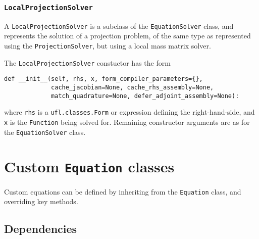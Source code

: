\documentclass[11pt]{article}
\begin{document}
\subsubsection{\texttt{LocalProjectionSolver}}

A \texttt{LocalProjectionSolver} is a subclass of the \texttt{EquationSolver}
class, and represents the solution of a projection problem, of the same type as
represented using the \texttt{ProjectionSolver}, but using a local mass matrix
solver.

The \texttt{LocalProjectionSolver} constuctor has the form
\begin{lstlisting}
def __init__(self, rhs, x, form_compiler_parameters={},
             cache_jacobian=None, cache_rhs_assembly=None,
             match_quadrature=None, defer_adjoint_assembly=None):
\end{lstlisting}
where \texttt{rhs} is a \texttt{ufl.classes.Form} or expression defining
the right-hand-side, and \texttt{x} is the \texttt{Function} being solved for.
Remaining constructor arguments are as for the \texttt{EquationSolver} class.

\section{Custom \texttt{Equation} classes}\label{sect:custom}

Custom equations can be defined by inheriting from the \texttt{Equation} class,
and overriding key methods.

\subsection{Dependencies}
\end{document}
